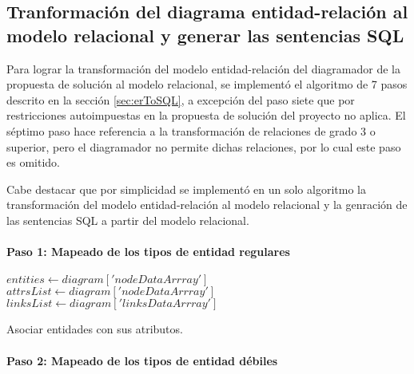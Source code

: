 \subsection{Tranformación del diagrama entidad-relación al modelo relacional y generar las sentencias SQL}\label{sec:desarrollo-sql}

Para lograr la transformación del modelo entidad-relación del diagramador de la propuesta de solución al modelo relacional, se implementó el algoritmo de 7 pasos descrito en la sección \ref{sec:erToSQL}, a excepción del paso siete que por restricciones autoimpuestas en la propuesta de solución del proyecto no aplica. El séptimo paso hace referencia a la transformación de relaciones de grado 3 o superior, pero el diagramador no permite dichas relaciones, por lo cual este paso es omitido.

Cabe destacar que por simplicidad se implementó en un solo algoritmo la transformación del modelo entidad-relación al modelo relacional y la genración de las sentencias SQL a partir del modelo relacional.

\paragraph*{Paso 1: Mapeado de los tipos de entidad regulares}

\begin{algorithm}[H]

  $entities \gets diagram['nodeDataArrray']$\\
  $attrsList \gets diagram['nodeDataArrray']$\\
  $linksList \gets diagram['linksDataArrray']$\\
   {
  }
  \caption{Asociar entidades con sus atributos.}
\end{algorithm}

\paragraph*{Paso 2: Mapeado de los tipos de entidad débiles}

